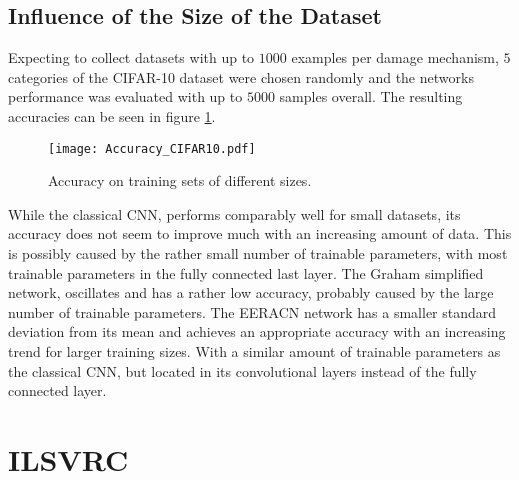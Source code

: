 \subsection{Influence of the Size of the Dataset}
Expecting to collect datasets with up to $1000$ examples per damage mechanism, $5$ categories of the CIFAR-10 dataset were chosen randomly and the networks performance was evaluated with up to $5000$ samples overall. The resulting accuracies can be seen in figure \ref{fig:Accuracy_Comparison_CIFAR10}. \\
\begin{figure}
  \texttt{[image: Accuracy\_CIFAR10.pdf]}
\caption{Accuracy on training sets of different sizes.}
\label{fig:Accuracy_Comparison_CIFAR10}
\end{figure}

While the classical CNN, performs comparably well for small datasets, its accuracy does not seem to improve much with an increasing amount of data. This is possibly caused by the rather small number of trainable parameters, with most trainable parameters in the fully connected last layer. The Graham simplified network, oscillates and has a rather low accuracy, probably caused by the large number of trainable parameters. The EERACN network has a smaller standard deviation from its mean and achieves an appropriate accuracy with an increasing trend for larger training sizes. With a similar amount of trainable parameters as the classical CNN, but located in its convolutional layers instead of the fully connected layer. \\

\section{ILSVRC}


